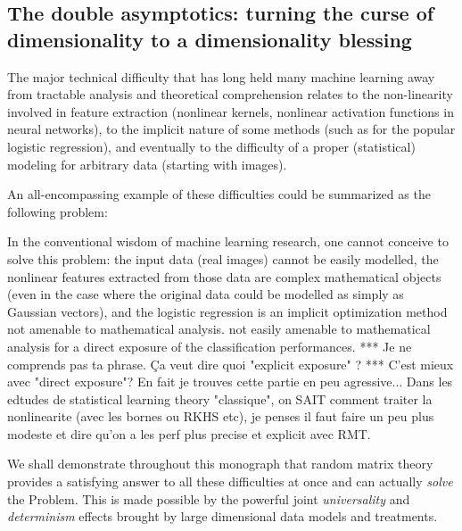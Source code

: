 \documentclass[MAL,biber]{nowfnt} %
\newcommand{\RED}{\color[rgb]{0.70,0,0}}
\newcommand{\BLUE}{\color[rgb]{0,0,0.69}}
\begin{document}
\subsection{The double asymptotics: turning the curse of dimensionality to a dimensionality blessing}

The major technical difficulty that has long held many machine learning away from tractable analysis and theoretical comprehension relates to the non-linearity involved in feature extraction (nonlinear kernels, nonlinear activation functions in neural networks), to the implicit nature of some methods (such as for the popular logistic regression), and eventually to the difficulty of a proper (statistical) modeling for arbitrary data (starting with images). 

An all-encompassing example of these difficulties could be summarized as the following problem: 
\smallskip

\noindent{}

\smallskip

In the conventional wisdom of machine learning research, one cannot conceive to solve this problem: the input data (real images) cannot be easily modelled, the nonlinear features extracted from those data are complex mathematical objects (even in the case where the original data could be modelled as simply as Gaussian vectors), and the logistic regression is an implicit optimization method not amenable to mathematical analysis. {\BLUE not easily amenable to mathematical analysis for a direct exposure of the classification performances.}
{\RED *** Je ne comprends pas ta phrase. Ça veut dire quoi "explicit exposure" ? ***}
{\BLUE C'est mieux avec "direct exposure"? En fait je trouves cette partie en peu agressive... Dans les edtudes de statistical learning theory "classique", on SAIT comment traiter la nonlinearite (avec les bornes ou RKHS etc), je penses il faut faire un peu plus modeste et dire qu'on a les perf plus precise et explicit avec RMT.}

We shall demonstrate throughout this monograph that random matrix theory provides a satisfying answer to all these difficulties at once and can actually \emph{solve} the Problem. This is made possible by the powerful joint \emph{universality} and \emph{determinism} effects brought by large dimensional data models and treatments.
\end{document}
